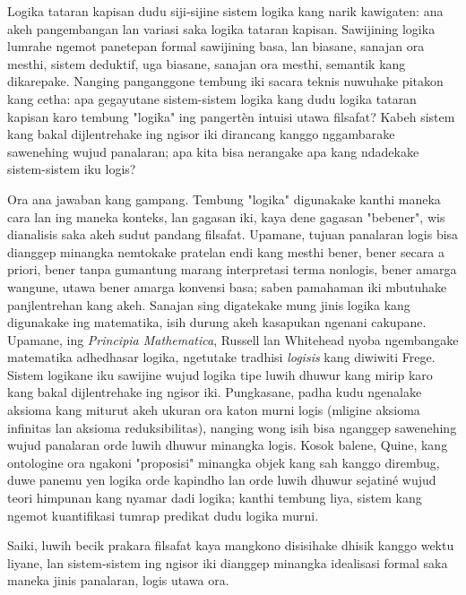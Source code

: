 \documentclass[../../../include/open-logic-section]{subfiles}
\begin{document}


Logika tataran kapisan dudu siji-sijine sistem logika
kang narik kawigaten: ana akeh pangembangan
lan variasi saka logika tataran kapisan. Sawijining
logika lumrahe ngemot panetepan formal sawijining
basa, lan biasane, sanajan ora mesthi,
sistem deduktif, uga biasane, sanajan ora mesthi,
semantik kang dikarepake. Nanging panganggone
tembung iki sacara teknis nuwuhake pitakon
kang cetha: apa gegayutane sistem-sistem logika
kang dudu logika tataran kapisan karo tembung "logika"
ing pangertèn intuisi utawa filsafat? Kabeh
sistem kang bakal dijlentrehake ing ngisor iki
dirancang kanggo nggambarake sawenehing wujud
panalaran; apa kita bisa nerangake apa kang
ndadekake sistem-sistem iku logis?

Ora ana jawaban kang gampang. Tembung "logika"
digunakake kanthi maneka cara lan ing maneka
konteks, lan gagasan iki, kaya dene gagasan
"bebener", wis dianalisis saka akeh sudut
pandang filsafat. Upamane, tujuan panalaran
logis bisa dianggep minangka nemtokake
pratelan endi kang mesthi bener, bener
secara a priori, bener tanpa gumantung
marang interpretasi terma nonlogis, bener
amarga wangune, utawa bener amarga
konvensi basa; saben pamahaman iki
mbutuhake panjlentrehan kang akeh. Sanajan
sing digatekake mung jinis logika kang
digunakake ing matematika, isih durung
akeh kasapukan ngenani cakupane. Upamane,
ing \textit{Principia Mathematica}, Russell
lan Whitehead nyoba ngembangake matematika
adhedhasar logika, ngetutake tradhisi
{\em logisis} kang diwiwiti Frege. Sistem
logikane iku sawijine wujud logika tipe
luwih dhuwur kang mirip karo kang bakal
dijlentrehake ing ngisor iki. Pungkasane,
padha kudu ngenalake aksioma kang miturut
akeh ukuran ora katon murni logis
(mligine aksioma infinitas lan aksioma
reduksibilitas), nanging wong isih bisa
nganggep sawenehing wujud panalaran
orde luwih dhuwur minangka logis.
Kosok balene, Quine, kang ontologine
ora ngakoni "proposisi" minangka objek
kang sah kanggo dirembug, duwe panemu
yen logika orde kapindho lan orde
luwih dhuwur sejatiné wujud teori
himpunan kang nyamar dadi logika;
kanthi tembung liya, sistem kang
ngemot kuantifikasi tumrap predikat
dudu logika murni.

Saiki, luwih becik prakara filsafat kaya
mangkono disisihake dhisik kanggo wektu
liyane, lan sistem-sistem ing ngisor iki
dianggep minangka idealisasi formal
saka maneka jinis panalaran, logis
utawa ora.
\end{document}
